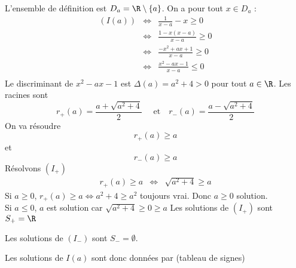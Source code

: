 
\begin{correction}
L'ensemble de définition est $D_a= \R\setminus \{ a\}$. 
On a pour tout $x\in D_a$ : 
\begin{eqnarray*}
(I(a))  &\Longleftrightarrow &\frac{1}{x-a}  -x  \geq 0\\
	&\Longleftrightarrow &\frac{1-x(x-a)}{x-a}  \geq 0\\
	&\Longleftrightarrow &\frac{- x^2 + ax+1}{x-a}  \geq 0\\
	&\Longleftrightarrow &\frac{x^2-ax-1}{x-a}  \leq 0 \\
\end{eqnarray*}
Le discriminant de $x^2-ax-1$ est $\Delta(a) = a^2+4>0$ pour tout $a\in \R$. 
Les racines sont 
$$r_+ (a) = \frac{a+\sqrt{a^2+4}}{2} \quad \text{ et} \quad r_- (a) = \frac{a-\sqrt{a^2+4}}{2} $$
On va résoudre
\begin{equation}\tag{$I_+$}
r_+(a) \geq a 
\end{equation} 
 et 
\begin{equation}\tag{$I_-$}
r_-(a) \geq a
\end{equation} 
Résolvons $(I_+)$
\begin{eqnarray}
r_+(a) \geq a &\Longleftrightarrow & \sqrt{a^2+4} \geq a
\end{eqnarray}
Si $a\geq 0$, $ r_+(a) \geq a \Longleftrightarrow  a^2+4 \geq a^2$ toujours vrai. Donc $a\geq 0 $ solution. \\
Si $a\leq 0$, $a$ est solution car $ \sqrt{a^2+4} \geq 0\geq a$
Les solutions de $(I_+)$ sont $S_+=\R$


Les solutions de $(I_-)$ sont $S_-=\emptyset$.


Les solutions de $I(a)$ sont donc données par (tableau de signes)
\conclusion{$]-\infty, r_-(a)]\cup ]a, r_+(a)]$)}

\end{correction}